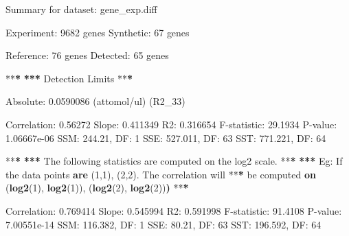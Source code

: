 \documentclass[]{article}
\newenvironment{Shaded}{\begin{snugshade}}{\end{snugshade}}
\newcommand{\KeywordTok}[1]{\textcolor[rgb]{0.13,0.29,0.53}{\textbf{{#1}}}}
\newcommand{\DecValTok}[1]{\textcolor[rgb]{0.00,0.00,0.81}{{#1}}}
\newcommand{\FloatTok}[1]{\textcolor[rgb]{0.00,0.00,0.81}{{#1}}}
\newcommand{\StringTok}[1]{\textcolor[rgb]{0.31,0.60,0.02}{{#1}}}
\newcommand{\ErrorTok}[1]{\textbf{{#1}}}
\newcommand{\NormalTok}[1]{{#1}}
\begin{document}
\begin{Shaded}
\begin{Highlighting}[]
\NormalTok{Summary for dataset:}\StringTok{ }\NormalTok{gene_exp.diff}

   \NormalTok{Experiment:}\StringTok{  }\DecValTok{9682} \NormalTok{genes}
   \NormalTok{Synthetic:}\StringTok{   }\DecValTok{67} \NormalTok{genes}

   \NormalTok{Reference:}\StringTok{   }\DecValTok{76} \NormalTok{genes}
   \NormalTok{Detected:}\StringTok{    }\DecValTok{65} \NormalTok{genes}

   \NormalTok{**}\ErrorTok{*}
\StringTok{   }\ErrorTok{***}\StringTok{ }\NormalTok{Detection Limits}
   \NormalTok{**}\ErrorTok{*}

\StringTok{   }\NormalTok{Absolute:}\StringTok{    }\FloatTok{0.0590086} \NormalTok{(attomol/ul) (R2_33)}

   \NormalTok{Correlation:}\StringTok{ }\FloatTok{0.56272}
   \NormalTok{Slope:}\StringTok{       }\FloatTok{0.411349}
   \NormalTok{R2:}\StringTok{          }\FloatTok{0.316654}
   \NormalTok{F-statistic:}\StringTok{ }\FloatTok{29.1934}
   \NormalTok{P-value:}\StringTok{     }\FloatTok{1.06667e-06}
   \NormalTok{SSM:}\StringTok{         }\FloatTok{244.21}\NormalTok{, DF:}\StringTok{ }\DecValTok{1}
   \NormalTok{SSE:}\StringTok{         }\FloatTok{527.011}\NormalTok{, DF:}\StringTok{ }\DecValTok{63}
   \NormalTok{SST:}\StringTok{         }\FloatTok{771.221}\NormalTok{, DF:}\StringTok{ }\DecValTok{64}

   \NormalTok{**}\ErrorTok{*}
\StringTok{   }\ErrorTok{***}\StringTok{ }\NormalTok{The following statistics are computed on the log2 scale.}
   \NormalTok{**}\ErrorTok{*}
\StringTok{   }\ErrorTok{***}\StringTok{   }\NormalTok{Eg:}\StringTok{ }\NormalTok{If the data points }\KeywordTok{are} \NormalTok{(}\DecValTok{1}\NormalTok{,}\DecValTok{1}\NormalTok{), (}\DecValTok{2}\NormalTok{,}\DecValTok{2}\NormalTok{). The correlation will}
   \NormalTok{**}\ErrorTok{*}\StringTok{       }\NormalTok{be computed }\KeywordTok{on} \NormalTok{(}\KeywordTok{log2}\NormalTok{(}\DecValTok{1}\NormalTok{), }\KeywordTok{log2}\NormalTok{(}\DecValTok{1}\NormalTok{)), (}\KeywordTok{log2}\NormalTok{(}\DecValTok{2}\NormalTok{), }\KeywordTok{log2}\NormalTok{(}\DecValTok{2}\NormalTok{))}\ErrorTok{)}
   \NormalTok{**}\ErrorTok{*}

\StringTok{   }\NormalTok{Correlation:}\StringTok{ }\FloatTok{0.769414}
   \NormalTok{Slope:}\StringTok{       }\FloatTok{0.545994}
   \NormalTok{R2:}\StringTok{          }\FloatTok{0.591998}
   \NormalTok{F-statistic:}\StringTok{ }\FloatTok{91.4108}
   \NormalTok{P-value:}\StringTok{     }\FloatTok{7.00551e-14}
   \NormalTok{SSM:}\StringTok{         }\FloatTok{116.382}\NormalTok{, DF:}\StringTok{ }\DecValTok{1}
   \NormalTok{SSE:}\StringTok{         }\FloatTok{80.21}\NormalTok{, DF:}\StringTok{ }\DecValTok{63}
   \NormalTok{SST:}\StringTok{         }\FloatTok{196.592}\NormalTok{, DF:}\StringTok{ }\DecValTok{64}
\end{Highlighting}
\end{Shaded}
\end{document}
